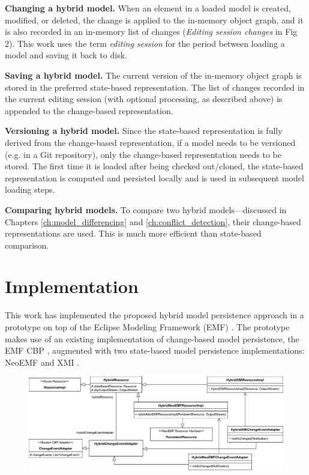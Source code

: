 \textbf{Changing a hybrid model.} When an element in a loaded model is created, modified, or deleted, the change is applied to the in-memory object graph, and it is also recorded in an in-memory list of changes (\textit{Editing session changes} in Fig 2). This work uses the term \emph{editing session} for the period between loading a model and saving it back to disk.

\textbf{Saving a hybrid model.} The current version of the in-memory object graph is stored in the preferred state-based representation. The list of changes recorded in the current editing session (with optional processing, as described above) is appended to the change-based representation.

\textbf{Versioning a hybrid model.} Since the state-based representation is fully derived from the change-based representation, if a model needs to be versioned (e.g. in a Git repository), only the change-based representation needs to be stored. The first time it is loaded after being checked out/cloned, the state-based representation is computed and persisted locally and is used in subsequent model loading steps.

\textbf{Comparing hybrid models.} To compare two hybrid models—discussed in Chapters \ref{ch:model_differencing} and \ref{ch:conflict_detection}, their change-based representations are used. This is much more efficient than state-based comparison.

\section{Implementation}
\label{sec:implementation}
This work has implemented the proposed hybrid model persistence approach in a prototype \cite{epsilonlabs2019emfcbp} on top of the Eclipse Modeling Framework (EMF) \cite{steinberg2008emf}. The prototype makes use of an existing implementation of change-based model persistence, the EMF CBP \cite{DBLP:conf/models/YohannisKP17}, augmented with two state-based model persistence implementations: NeoEMF \cite{daniel2016neoemf} and XMI \cite{omg2018xmi}.

\begin{landscape}
  \begin{figure}[]
    \includegraphics[width=\linewidth]{images/class_diagram}
    \label{fig:class_diagram}
  \end{figure}
\end{landscape}

